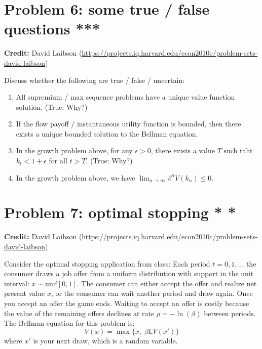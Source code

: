 \documentclass[11pt]{extarticle}
\theoremstyle{plain}
\theoremstyle{definition}
\begin{document}
\vspace{10mm}
\section*{Problem 6: some true / false questions ***}

\textbf{Credit:} David Laibson (\url{https://projects.iq.harvard.edu/econ2010c/problem-sets-david-laibson})

\vspace{5mm}
\noindent
Discuss whether the following are true / false / uncertain:
\begin{enumerate}
\item All supremium / max sequence problems have a unique value function solution. (True: Why?) 

\item If the flow payoff / instantaneous utility function is bounded, then there exists a unique bounded solution to the Bellman equation. 

\item In the growth problem above, for any $\epsilon > 0$, there exists a value $T$ such taht $k_t < 1 + \epsilon$ for all $t > T$. (True: Why?)

\item In the growth problem above, we have $\lim_{n \to \infty} \beta^n V(k_n) \leq 0$. 
\end{enumerate}




\vspace{10mm}
\section*{Problem 7: optimal stopping * *}

\textbf{Credit:} David Laibson (\url{https://projects.iq.harvard.edu/econ2010c/problem-sets-david-laibson})

\vspace{5mm}
\noindent
Consider the optimal stopping application from class: Each period $t = 0, 1, \ldots$ the consumer draws a job offer from a uniform distribution with support in the unit interval: $x \sim \text{unif}[0, 1]$. The consumer can either accept the offer and realize net present value $x$, or the consumer can wait another period and draw again. Once you accept an offer the game ends. Waiting to accept an offer is costly because the value of the remaining offers declines at rate $\rho = - \ln(\beta)$ between periods. The Bellman equation for this problem is:
\begin{equation*}
	V(x) = \max \bigg\{ x, \; \beta \mathbb E V(x') \bigg\}
\end{equation*}
where $x'$ is your next draw, which is a random variable.
\end{document}
